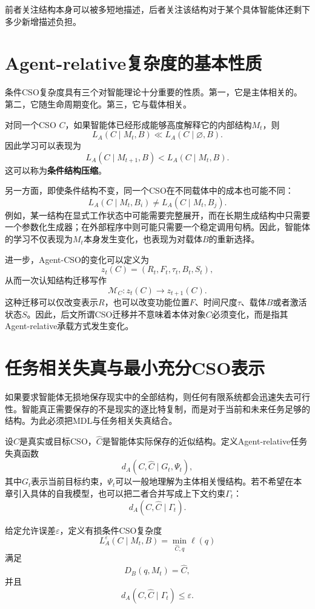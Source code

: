 前者关注结构本身可以被多短地描述，后者关注该结构对于某个具体智能体还剩下多少新增描述负担。

\section{Agent-relative复杂度的基本性质}

条件CSO复杂度具有三个对智能理论十分重要的性质。第一，它是主体相关的。第二，它随生命周期变化。第三，它与载体相关。

对同一个CSO $C$，如果智能体已经形成能够高度解释它的内部结构$M_t$，则
\[
L_A(C\mid M_t,B)
\ll
L_A(C\mid \varnothing,B).
\]
因此学习可以表现为
\[
L_A(C\mid M_{t+1},B)
<
L_A(C\mid M_t,B).
\]
这可以称为\textbf{条件结构压缩}。

另一方面，即使条件结构不变，同一个CSO在不同载体中的成本也可能不同：
\[
L_A(C\mid M_t,B_i)
\neq
L_A(C\mid M_t,B_j).
\]
例如，某一结构在显式工作状态中可能需要完整展开，而在长期生成结构中只需要一个参数化生成器；在外部程序中则可能只需要一个稳定调用句柄。因此，智能体的学习不仅表现为$M_t$本身发生变化，也表现为对载体$B$的重新选择。

进一步，Agent-CSO的变化可以定义为
\[
z_t(C)
=
\left(
R_t,F_t,\tau_t,B_t,S_t
\right),
\]
从而一次认知结构迁移写作
\[
\boxed{
\mathcal{M}_C:
z_t(C)
\longrightarrow
z_{t+1}(C).
}
\]
这种迁移可以仅改变表示$R$，也可以改变功能位置$F$、时间尺度$\tau$、载体$B$或者激活状态$S$。因此，后文所谓CSO迁移并不意味着本体对象$C$必须变化，而是指其Agent-relative承载方式发生变化。

\section{任务相关失真与最小充分CSO表示}

如果要求智能体无损地保存现实中的全部结构，则任何有限系统都会迅速失去可行性。智能真正需要保存的不是现实的逐比特复制，而是对于当前和未来任务足够的结构。为此必须把MDL与任务相关失真结合。

设$C$是真实或目标CSO，$\hat C$是智能体实际保存的近似结构。定义Agent-relative任务失真函数
\[
d_A
\left(
C,\hat C
\mid
G_t,\Psi_t
\right),
\]
其中$G_t$表示当前目标约束，$\Psi_t$可以一般地理解为主体相关慢结构。若不希望在本章引入具体的自我模型，也可以把二者合并写成上下文约束$\Gamma_t$：
\[
d_A(C,\hat C\mid\Gamma_t).
\]

给定允许误差$\varepsilon$，定义有损条件CSO复杂度
\[
\boxed{
L_A^\varepsilon(C\mid M_t,B)
=
\min_{\hat C,q}
\ell(q)
}
\]
满足
\[
D_B(q,M_t)=\hat C,
\]
并且
\[
d_A(C,\hat C\mid\Gamma_t)
\leq
\varepsilon.
\]

